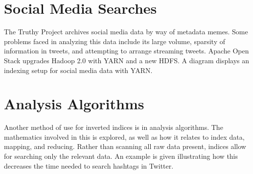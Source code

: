 


\section{Social Media Searches}

The Truthy Project archives social media data by way of metadata memes.
Some problems faced in analyzing this data include its large volume,
sparsity of information in tweets, and attempting to arrange streaming
tweets. Apache Open Stack upgrades Hadoop 2.0 with YARN and a new HDFS.
A diagram displays an indexing setup for social media data with YARN.




\section{Analysis Algorithms}

Another method of use for inverted indices is in analysis algorithms.
The mathematics involved in this is explored, as well as how it
relates to index data, mapping, and reducing. Rather than scanning all
raw data present, indices allow for searching only the relevant
data. An example is given illustrating how this decreases the time
needed to search hashtags in Twitter.





